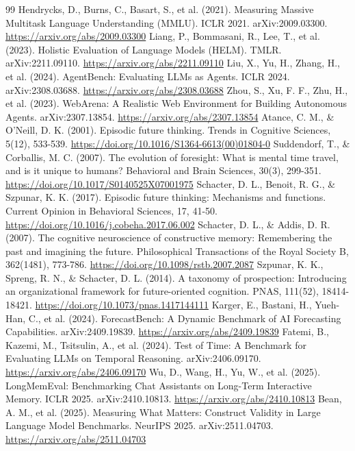 \begin{thebibliography}{99}
\small
{} Hendrycks, D., Burns, C., Basart, S., et al. (2021). Measuring Massive Multitask Language Understanding (MMLU). ICLR 2021. arXiv:2009.03300. \url{https://arxiv.org/abs/2009.03300}
 Liang, P., Bommasani, R., Lee, T., et al. (2023). Holistic Evaluation of Language Models (HELM). TMLR. arXiv:2211.09110. \url{https://arxiv.org/abs/2211.09110}
 Liu, X., Yu, H., Zhang, H., et al. (2024). AgentBench: Evaluating LLMs as Agents. ICLR 2024. arXiv:2308.03688. \url{https://arxiv.org/abs/2308.03688}
 Zhou, S., Xu, F. F., Zhu, H., et al. (2023). WebArena: A Realistic Web Environment for Building Autonomous Agents. arXiv:2307.13854. \url{https://arxiv.org/abs/2307.13854}
 Atance, C. M., \& O'Neill, D. K. (2001). Episodic future thinking. Trends in Cognitive Sciences, 5(12), 533-539. \url{https://doi.org/10.1016/S1364-6613(00)01804-0}
 Suddendorf, T., \& Corballis, M. C. (2007). The evolution of foresight: What is mental time travel, and is it unique to humans? Behavioral and Brain Sciences, 30(3), 299-351. \url{https://doi.org/10.1017/S0140525X07001975}
 Schacter, D. L., Benoit, R. G., \& Szpunar, K. K. (2017). Episodic future thinking: Mechanisms and functions. Current Opinion in Behavioral Sciences, 17, 41-50. \url{https://doi.org/10.1016/j.cobeha.2017.06.002}
 Schacter, D. L., \& Addis, D. R. (2007). The cognitive neuroscience of constructive memory: Remembering the past and imagining the future. Philosophical Transactions of the Royal Society B, 362(1481), 773-786. \url{https://doi.org/10.1098/rstb.2007.2087}
 Szpunar, K. K., Spreng, R. N., \& Schacter, D. L. (2014). A taxonomy of prospection: Introducing an organizational framework for future-oriented cognition. PNAS, 111(52), 18414-18421. \url{https://doi.org/10.1073/pnas.1417144111}
 Karger, E., Bastani, H., Yueh-Han, C., et al. (2024). ForecastBench: A Dynamic Benchmark of AI Forecasting Capabilities. arXiv:2409.19839. \url{https://arxiv.org/abs/2409.19839}
 Fatemi, B., Kazemi, M., Tsitsulin, A., et al. (2024). Test of Time: A Benchmark for Evaluating LLMs on Temporal Reasoning. arXiv:2406.09170. \url{https://arxiv.org/abs/2406.09170}
 Wu, D., Wang, H., Yu, W., et al. (2025). LongMemEval: Benchmarking Chat Assistants on Long-Term Interactive Memory. ICLR 2025. arXiv:2410.10813. \url{https://arxiv.org/abs/2410.10813}
 Bean, A. M., et al. (2025). Measuring What Matters: Construct Validity in Large Language Model Benchmarks. NeurIPS 2025. arXiv:2511.04703. \url{https://arxiv.org/abs/2511.04703}

\end{thebibliography}
